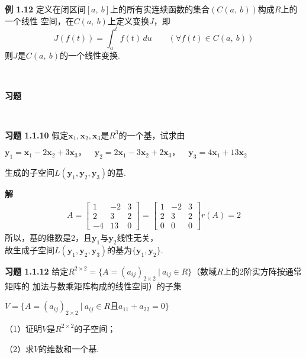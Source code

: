 \documentclass[12pt, a4paper, oneside, fontset=none]{ctexart}
\begin{document}
\textbf{例 1.12} \quad 定义在闭区间$[a,\ b]$上的所有实连续函数的集合$(C(a, \ b))$构成$R$上的一个线性
空间，在$C(a,\ b)$上定义变换$J$，即
$$
    J(f(t)) = \int_a^t f(t)\, du \qquad (\forall f(t) \in C(a, \ b))
$$
则$J$是$C(a, \ b)$的一个线性变换. \par \ \par

\centerline{\large{\textbf{习题}}} \ \par

\textbf{习题 1.1.10} \quad 假定$\bm{x}_1, \bm{x}_2, \bm{x}_3$是$R^3$的一个基，试求由 \\
\centerline{$\bm{y}_1 = \bm{x}_1 - 2\bm{x}_2 + 3\bm{x}_3，\quad \bm{y}_2 = 2\bm{x}_1 - 3\bm{x}_2 + 2\bm{x}_3，\quad \bm{y}_3 = 4\bm{x}_1 + 13\bm{x}_2$}
生成的子空间$L(\bm{y}_1, \bm{y}_2, \bm{y}_3)$的基.

\textbf{解} \quad
\begin{align*}
    A = \begin{bmatrix}
            1  & -2 & 3 \\
            2  & 3  & 2 \\
            -4 & 13 & 0
        \end{bmatrix} = \begin{bmatrix}
                            1 & -2 & 3 \\
                            2 & 3  & 2 \\
                            0 & 0  & 0
                        \end{bmatrix}
    r(A) = 2
\end{align*}
所以，基的维数是2，且$\bm{y}_1$与$\bm{y}_2$线性无关，\\
故生成子空间$L(\bm{y}_1, \bm{y}_2, \bm{y}_3)$的基为$\{\bm{y}_1, \bm{y}_2\}$.

\textbf{习题 1.1.12} \quad 给定$R^{2\times 2} = \{A = (a_{ij})_{2\times 2} \ | \ a_{ij} \in R\}$（数域$R$上的2阶实方阵按通常矩阵的
加法与数乘矩阵构成的线性空间）的子集 \par
\centerline{$V = \{A = (a_{ij})_{2\times 2} \ | \ a_{ij} \in R$且$a_{11}+a_{22}=0\}$}
（1）证明$V$是$R^{2\times 2}$的子空间； \par
（2）求$V$的维数和一个基.
\end{document}
